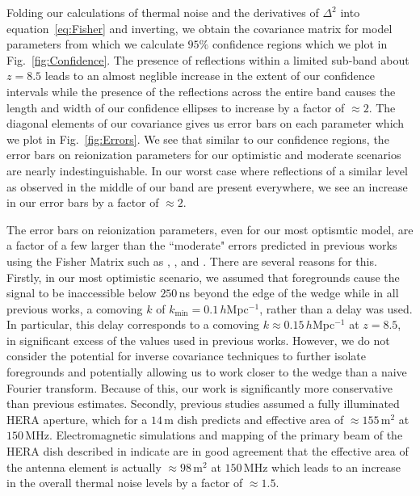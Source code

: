 \documentclass[twocolumn]{emulateapj}
\begin{document}
Folding our calculations of thermal noise and the derivatives of $\Delta^2$ into equation~\ref{eq:Fisher} and inverting, we obtain the covariance matrix for model parameters from which we calculate $95\%$ confidence regions which we plot in Fig.~\ref{fig:Confidence}. The presence of reflections within a limited sub-band about $z=8.5$ leads to an almost neglible increase in the extent of our confidence intervals while the presence of the reflections across the entire band causes the length and width of our confidence ellipses to increase by a factor of $\approx 2$. The diagonal elements of our covariance gives us error bars on each parameter which we plot in Fig.~\ref{fig:Errors}. We see that similar to our confidence regions, the error bars on reionization parameters for our optimistic and moderate scenarios are nearly indestinguishable. In our worst case where reflections of a similar level as observed in the middle of our band are present everywhere, we see an increase in our error bars by a factor of $\approx 2$. 

The error bars on reionization parameters, even for our most optismtic model, are a factor of a few larger than the ``moderate" errors predicted in previous works using the Fisher Matrix such as \citet{Pober:2014}, \citet{EwallWice:2015a}, and \citet{Liu:2015a,Liu:2015b}. There are several reasons for this. Firstly, in our most optimistic scenario, we assumed that foregrounds cause the signal to be inaccessible below $250$\,ns beyond the edge of the wedge while in all previous works, a comoving $k$ of $k_\text{min}=0.1$\,$h$Mpc$^{-1}$, rather than a delay was used. In particular, this delay corresponds to a comoving $k\approx0.15$\,$h$Mpc$^{-1}$ at $z=8.5$, in significant excess of the values used in previous works. However, we do not consider the potential for inverse covariance techniques to further isolate foregrounds and potentially allowing us to work closer to the wedge than a naive Fourier transform. Because of this, our work is significantly more conservative than previous estimates. Secondly, previous studies assumed a fully illuminated HERA aperture, which for a $14$\,m dish predicts and effective area of $\approx155$\,m$^2$ at $150$\,MHz. Electromagnetic simulations and mapping of the primary beam of the HERA dish described in \citep{Neben:2016} indicate are in good agreement that the effective area of the antenna element is actually $\approx 98$\,m$^2$ at $150$\,MHz which leads to an increase in the overall thermal noise levels by a factor of $\approx 1.5$. 
\end{document}
